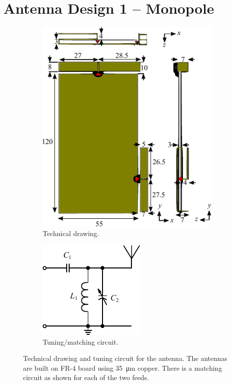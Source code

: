 \section{Antenna Design 1 -- Monopole}

\begin{figure}[htbp]
    \begin{subfigure}[b]{0.49\linewidth}
        \centering
        \includegraphics{img/tech_sol/monopole/tech_drawing}
        \caption{Technical drawing.}
        \label{fig:ant1technical}
    \end{subfigure}
    \hfill
    \begin{subfigure}[b]{0.49\linewidth}
        \centering
        \includegraphics{img/tech_sol/schematic_tuning_1}
        \caption{Tuning/matching circuit.}
        \label{fig:ant1schematic}
    \end{subfigure}
    \caption{Technical drawing and tuning circuit for the antenna.  The antennas are built on FR-4 board using \SI{35}{\micro\meter} copper. There is a matching circuit as shown for each of the two feeds.}
    \label{fig:ant2techschem}
\end{figure}

